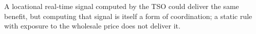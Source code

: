 




    A locational real-time signal computed by the TSO could deliver the same benefit, but computing that signal is itself a form of coordination; a static rule with exposure to the wholesale price does not deliver it.

